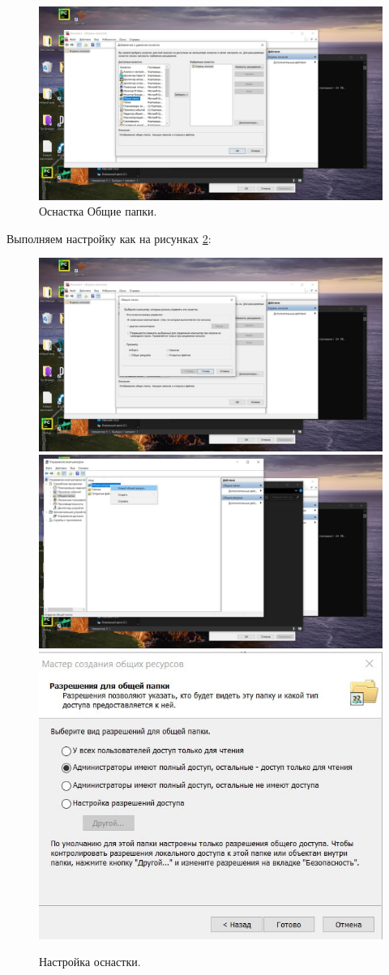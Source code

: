 \begin{figure}
    \centering
    \includegraphics[width=0.5\linewidth]{Pic/lab2/photo_2025-05-22_00-25-53.jpg}
    \caption{Оснастка Общие папки.}
    \label{fig:CommonFiles}
\end{figure}

Выполняем настройку как на рисунках \ref{fig:CFprop}:

\begin{figure}[h!]
    \centering
    \includegraphics[width=0.5\linewidth]{Pic/lab2/photo_2025-05-22_00-25-55.jpg}
    \includegraphics[width=0.5\linewidth]{Pic/lab2/photo_2025-05-22_00-25-57.jpg}
    \includegraphics[width=0.5\linewidth]{Pic/lab2/photo_2025-05-22_00-25-58.jpg}
    \caption{Настройка оснастки.}
    \label{fig:CFprop}
\end{figure}

